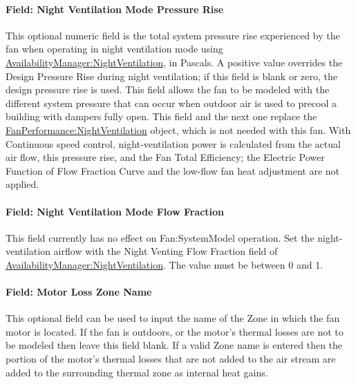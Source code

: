 \paragraph{Field: Night Ventilation Mode Pressure Rise}\label{field-nite-vent-pressure-fansysmodel}

This optional numeric field is the total system pressure rise experienced by the fan when operating in night ventilation mode using \hyperref[availabilitymanagernightventilation]{AvailabilityManager:NightVentilation}, in Pascals. A positive value overrides the Design Pressure Rise during night ventilation; if this field is blank or zero, the design pressure rise is used. This field allows the fan to be modeled with the different system pressure that can occur when outdoor air is used to precool a building with dampers fully open. This field and the next one replace the \hyperref[fanperformancenightventilation]{FanPerformance:NightVentilation} object, which is not needed with this fan. With Continuous speed control, night-ventilation power is calculated from the actual air flow, this pressure rise, and the Fan Total Efficiency; the Electric Power Function of Flow Fraction Curve and the low-flow fan heat adjustment are not applied.

\paragraph{Field: Night Ventilation Mode Flow Fraction}\label{field-nite-vent-flow-fraction-fansysmodel}

This field currently has no effect on Fan:SystemModel operation. Set the night-ventilation airflow with the Night Venting Flow Fraction field of \hyperref[availabilitymanagernightventilation]{AvailabilityManager:NightVentilation}. The value must be between 0 and 1.

\paragraph{Field: Motor Loss Zone Name}\label{field-loss-zone-name-fansysmodel}

This optional field can be used to input the name of the Zone in which the fan motor is located.  If the fan is outdoors, or the motor's thermal losses are not to be modeled then leave this field blank.  If a valid Zone name is entered then the portion of the motor's thermal losses that are not added to the air stream are added to the surrounding thermal zone as internal heat gains.

